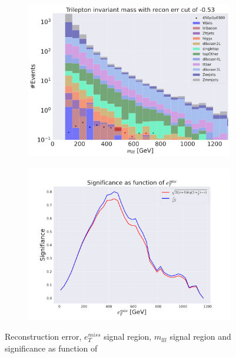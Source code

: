 \begin{figure}[H]
    \hfill
    \begin{subfigure}{.40\textwidth}
        \includegraphics[width=\textwidth]{Figures/VAE_testing/small/3lep/b_data_recon_big_rm3_feats_sig_450p0p0300_mlll_recon_errcut_-0.53.pdf}
        \caption{}
        \label{fig:VAE_3lep_small_mlll_450_3}
    \end{subfigure}
    \hfill   
    \begin{subfigure}{.40\textwidth}
        \includegraphics[width=\textwidth]{Figures/VAE_testing/small/3lep/significance_etmiss_450p0p0300_-0.530518613616577.pdf}
        \caption{}
        \label{fig:VAE_3lep_small_signi_450_3}
    \end{subfigure}
    \hfill      
    \caption[3lep shallow network | $450p300$ | VAE | 3]{Reconstruction error, $e_T^{miss}$ signal region, $m_{lll}$ signal region and significance as function of 
}
\end{figure}
